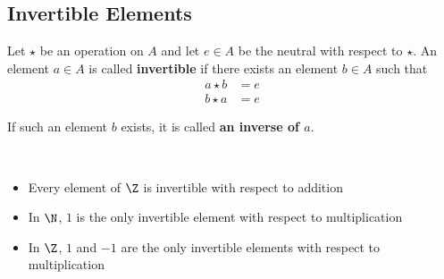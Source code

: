 \subsection{Invertible Elements}

\begin{definition}\label{def:invertible-element}
    Let $\star$ be an operation on $A$ and let $e \in A$ be the neutral with respect to $\star$. An element $a \in A$ is called \textbf{invertible} if there exists an element $b \in A$ such that
    \begin{align*}
        a \star b &= e \\
        b \star a &= e
    \end{align*}
    
    If such an element $b$ exists, it is called \textbf{an inverse of $a$}.
\end{definition}

\begin{eg}\
    \begin{itemize}
        \item Every element of $\Z$ is invertible with respect to addition
        \item In $\N$, $1$ is the only invertible element with respect to multiplication
        \item In $\Z$, $1$ and $-1$ are the only invertible elements with respect to multiplication
    \end{itemize}
\end{eg}